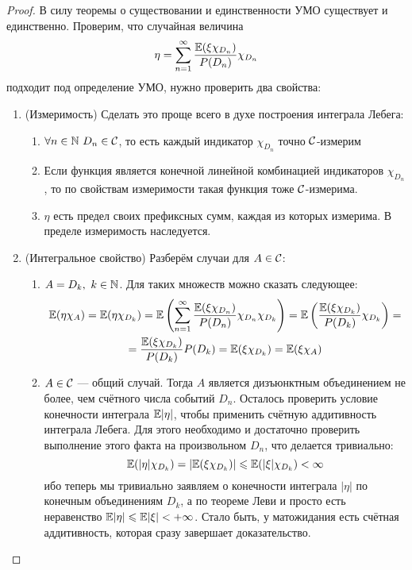 \begin{proof}
    В силу теоремы о существовании и единственности УМО существует и единственно. Проверим, что случайная величина
    \[
        \eta = \sum_{n = 1}^{\infty} \frac{\mathbb{E}(\xi \chi_{D_n})}{P(D_n)} \chi_{D_n}
    \]
    подходит под определение УМО, нужно проверить два свойства:
    \begin{enumerate}
        \item (Измеримость) Сделать это проще всего в духе построения интеграла Лебега:
        \begin{enumerate}
        	\item $\forall n \in \mathbb{N}\ D_n \in \mathcal{C}$, то есть каждый индикатор $\chi_{D_n}$ точно $\mathcal{C}$-измерим
        	
        	\item Если функция является конечной линейной комбинацией индикаторов $\chi_{D_n}$, то по свойствам измеримости такая функция тоже $\mathcal{C}$-измерима.
        	
        	\item $\eta$ есть предел своих префиксных сумм, каждая из которых измерима. В пределе измеримость наследуется.
        \end{enumerate}

        \item (Интегральное свойство) Разберём случаи для $A \in \mathcal{C}$:
        \begin{enumerate}
        	\item $A = D_k,\ k \in \mathbb{N}$. Для таких множеств можно сказать следующее:
        	\begin{multline*}
        		\mathbb{E}(\eta \chi_A) = \mathbb{E}(\eta \chi_{D_k}) = \mathbb{E} \left( \sum_{n = 1}^{\infty} \frac{\mathbb{E}(\xi \chi_{D_n})}{P(D_n)} \chi_{D_n} \chi_{D_k} \right) = \mathbb{E} \left(\frac{\mathbb{E}(\xi \chi_{D_k})}{P(D_k)} \chi_{D_k} \right) =
        		\\
        		= \frac{\mathbb{E}(\xi \chi_{D_k})}{P(D_k)} P(D_k) = \mathbb{E}(\xi \chi_{D_k}) = \mathbb{E}(\xi \chi_A)
        	\end{multline*}
        	
        	\item $A \in \mathcal{C}$ --- общий случай. Тогда $A$ является дизъюнктным объединением не более, чем счётного числа событий $D_n$. Осталось проверить условие конечности интеграла $\mathbb{E}|\eta|$, чтобы применить счётную аддитивность интеграла Лебега. Для этого необходимо и достаточно проверить выполнение этого факта на произвольном $D_n$, что делается тривиально:
        	\[
        		\mathbb{E}(|\eta|\chi_{D_k}) = |\mathbb{E}(\xi\chi_{D_k})| \leqslant \mathbb{E}(|\xi|\chi_{D_k}) < \infty
        	\]
        	ибо теперь мы тривиально заявляем о конечности интеграла $|\eta|$ по конечным объединениям $D_k$, а по теореме Леви и просто есть неравенство $\mathbb{E}|\eta| \leqslant \mathbb{E}|\xi| < +\infty$. Стало быть, у матожидания есть счётная аддитивность, которая сразу завершает доказательство.
        \end{enumerate}
    \end{enumerate}
\end{proof}

